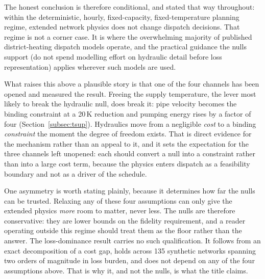 The honest conclusion is therefore conditional, and stated that way throughout: within
the deterministic, hourly, fixed-capacity, fixed-temperature planning regime, extended
network physics does not change dispatch decisions. That regime is not a corner case. It is
where the overwhelming majority of published district-heating dispatch models operate, and
the practical guidance the nulls support (do not spend modelling effort on hydraulic
detail before loss representation) applies wherever such models are used.

What raises this above a plausible story is that one of the four channels has been opened
and measured the result. Freeing the supply temperature, the lever most likely to break the
hydraulic null, does break it: pipe velocity becomes the binding constraint at a 20\,K
reduction and pumping energy rises by a factor of four
(Section~\ref{subsec:tsup}). Hydraulics move from a negligible \emph{cost} to a binding
\emph{constraint} the moment the degree of freedom exists. That is direct evidence for the
mechanism rather than an appeal to it, and it sets the expectation for the three channels
left unopened: each should convert a null into a constraint rather than into a large cost
term, because the physics enters dispatch as a feasibility boundary and not as a driver of
the schedule.

One asymmetry is worth stating plainly, because it determines how far the nulls can be
trusted. Relaxing any of these four assumptions can only give the extended physics
\emph{more} room to matter, never less. The nulls are therefore conservative: they are
lower bounds on the fidelity requirement, and a reader operating outside this regime should
treat them as the floor rather than the answer. The loss-dominance result carries no such
qualification. It follows from an exact decomposition of a cost gap, holds across 135
synthetic networks spanning two orders of magnitude in loss burden, and does not depend on
any of the four assumptions above. That is why it, and not the nulls, is what the title
claims.
